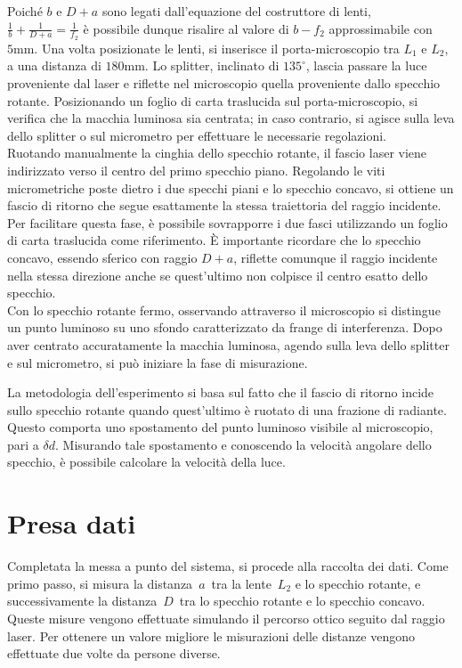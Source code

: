 \documentclass{article}
\begin{document}
Poiché \( b \) e \( D + a \) sono legati dall’equazione del costruttore di lenti, \\  \(\frac{1}{b} + \frac{1}{D + a} = \frac{1}{f_2}\)
è possibile dunque risalire al valore di \( b - f_2 \) approssimabile con \(5\text{mm}\).
Una volta posizionate le lenti, si inserisce il porta-microscopio tra \( L_1 \) e \( L_2 \), a una distanza di \( 180 \text{mm}\). 
Lo splitter, inclinato di \( 135^\circ \), lascia passare la luce proveniente dal laser e riflette nel microscopio quella proveniente dallo specchio rotante. Posizionando un foglio di carta traslucida sul porta-microscopio, si verifica che la macchia luminosa sia centrata; in caso contrario, si agisce sulla leva dello splitter o sul micrometro per effettuare le necessarie regolazioni.\\
Ruotando manualmente la cinghia dello specchio rotante, il fascio laser viene indirizzato verso il centro del primo specchio piano. Regolando le viti micrometriche poste dietro i due specchi piani e lo specchio concavo, si ottiene un fascio di ritorno che segue esattamente la stessa traiettoria del raggio incidente. Per facilitare questa fase, è possibile sovrapporre i due fasci utilizzando un foglio di carta traslucida come riferimento. È importante ricordare che lo specchio concavo, essendo sferico con raggio \( D + a \), riflette comunque il raggio incidente nella stessa direzione anche se quest’ultimo non colpisce il centro esatto dello specchio.  \\
Con lo specchio rotante fermo, osservando attraverso il microscopio si distingue un punto luminoso su uno sfondo caratterizzato da frange di interferenza. Dopo aver centrato accuratamente la macchia luminosa, agendo sulla leva dello splitter e sul micrometro, si può iniziare la fase di misurazione.

La metodologia dell’esperimento si basa sul fatto che il fascio di ritorno incide sullo specchio rotante quando quest’ultimo è ruotato di una frazione di radiante. Questo comporta uno spostamento del punto luminoso visibile al microscopio, pari a \( \delta d \). Misurando tale spostamento e conoscendo la velocità angolare dello specchio, è possibile calcolare la velocità della luce.


\section{Presa dati}
Completata la messa a punto del sistema, si procede alla raccolta dei dati. Come primo passo, si misura la distanza \(a\) tra la lente \(L_2\) e lo specchio rotante, e successivamente la distanza \(D\) tra lo specchio rotante e lo specchio concavo. Queste misure vengono effettuate simulando il percorso ottico seguito dal raggio laser. Per ottenere un valore migliore le misurazioni delle distanze vengono effettuate due volte da persone diverse.
\end{document}
